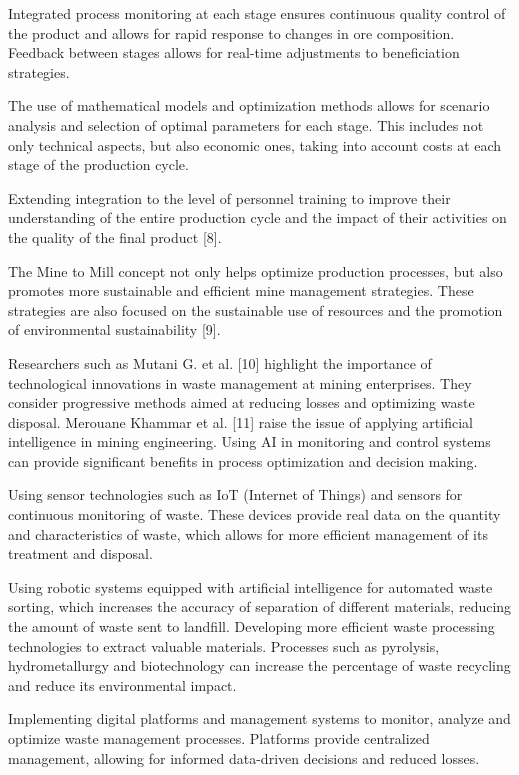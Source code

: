 \begin{multicols}{2}
Integrated process monitoring at each stage ensures continuous quality
control of the product and allows for rapid response to changes in ore
composition. Feedback between stages allows for real-time adjustments to
beneficiation strategies.

The use of mathematical models and optimization methods allows for
scenario analysis and selection of optimal parameters for each stage.
This includes not only technical aspects, but also economic ones, taking
into account costs at each stage of the production cycle.

Extending integration to the level of personnel training to improve
their understanding of the entire production cycle and the impact of
their activities on the quality of the final product {[}8{]}.

The Mine to Mill concept not only helps optimize production processes,
but also promotes more sustainable and efficient mine management
strategies. These strategies are also focused on the sustainable use of
resources and the promotion of environmental sustainability {[}9{]}.

Researchers such as Mutani G. et al. {[}10{]} highlight the importance
of technological innovations in waste management at mining enterprises.
They consider progressive methods aimed at reducing losses and
optimizing waste disposal. Merouane Khammar et al. {[}11{]} raise the
issue of applying artificial intelligence in mining engineering. Using
AI in monitoring and control systems can provide significant benefits in
process optimization and decision making.

Using sensor technologies such as IoT (Internet of Things) and sensors
for continuous monitoring of waste. These devices provide real data on
the quantity and characteristics of waste, which allows for more
efficient management of its treatment and disposal.

Using robotic systems equipped with artificial intelligence for
automated waste sorting, which increases the accuracy of separation of
different materials, reducing the amount of waste sent to landfill.
Developing more efficient waste processing technologies to extract
valuable materials. Processes such as pyrolysis, hydrometallurgy and
biotechnology can increase the percentage of waste recycling and reduce
its environmental impact.

Implementing digital platforms and management systems to monitor,
analyze and optimize waste management processes. Platforms provide
centralized management, allowing for informed data-driven decisions and
reduced losses.


\end{multicols}

